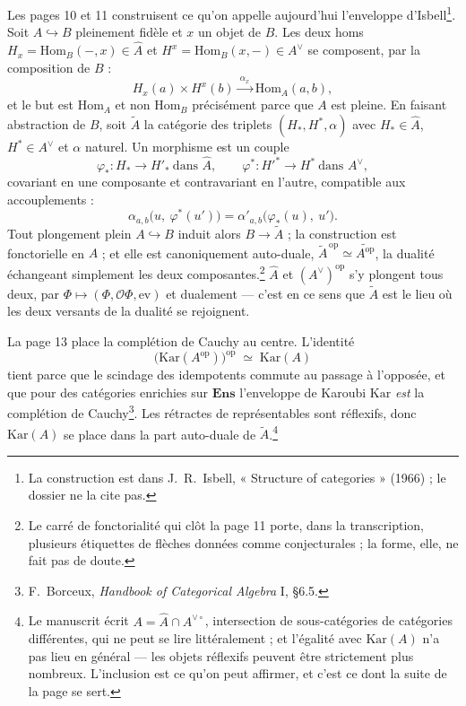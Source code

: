\documentclass[11pt,a4paper]{article}
\begin{document}
Les pages 10 et 11 construisent ce qu'on appelle aujourd'hui l'enveloppe
d'Isbell\footnote{La construction est dans J.~R.~Isbell, « Structure of
categories » (1966) ; le dossier ne la cite pas.}. Soit $A \hookrightarrow B$ pleinement fidèle et $x$ un objet de $B$.
Les deux homs $H_{x} = \mathrm{Hom}_{B}(-, x) \in \widehat{A}$ et $H^{x} =
\mathrm{Hom}_{B}(x, -) \in A^{\vee}$ se composent, par la composition de $B$ :
\[
H_{x}(a) \times H^{x}(b) \xrightarrow{\ \alpha_{x}\ } \mathrm{Hom}_{A}(a,b),
\]
et le but est $\mathrm{Hom}_{A}$ et non $\mathrm{Hom}_{B}$ précisément parce
que $A$ est pleine. En faisant abstraction de $B$, soit $\widetilde{A}$ la
catégorie des triplets $(H_{*}, H^{*}, \alpha)$ avec $H_{*} \in \widehat{A}$,
$H^{*} \in A^{\vee}$ et $\alpha$ naturel. Un morphisme est un couple
\[
\varphi_{*} : H_{*} \to H'_{*} \ \text{dans } \widehat{A},
\qquad
\varphi^{*} : H'^{*} \to H^{*} \ \text{dans } A^{\vee},
\]
covariant en une composante et contravariant en l'autre, compatible aux
accouplements :
\[
\alpha_{a,b}\bigl(u,\ \varphi^{*}(u')\bigr)
= \alpha'_{a,b}\bigl(\varphi_{*}(u),\ u'\bigr).
\]
Tout plongement plein $A \hookrightarrow B$ induit alors $B \to \widetilde{A}$ ;
la construction est fonctorielle en $A$ ; et elle est canoniquement auto-duale,
$\widetilde{A}^{\,\mathrm{op}} \simeq \widetilde{A^{\mathrm{op}}}$, la dualité
échangeant simplement les deux composantes.\footnote{Le carré de fonctorialité
qui clôt la page 11 porte, dans la transcription, plusieurs étiquettes de
flèches données comme conjecturales ; la forme, elle, ne fait pas de doute.}
$\widehat{A}$ et $(A^{\vee})^{\mathrm{op}}$ s'y plongent tous deux, par
$\Phi \mapsto (\Phi, \mathcal{O}\Phi, \mathrm{ev})$ et dualement — c'est en
ce sens que $\widetilde{A}$ est le lieu où les deux versants de la dualité se
rejoignent.

La page 13 place la complétion de Cauchy au centre. L'identité
\[
\bigl(\mathrm{Kar}(A^{\mathrm{op}})\bigr)^{\mathrm{op}} \;\simeq\; \mathrm{Kar}(A)
\]
tient parce que le scindage des idempotents commute au passage à l'opposée, et
que pour des catégories enrichies sur $\mathbf{Ens}$ l'enveloppe de Karoubi
$\mathrm{Kar}$ \emph{est} la complétion de Cauchy\footnote{F.~Borceux,
\emph{Handbook of Categorical Algebra} I, §6.5.}. Les rétractes de
représentables sont réflexifs, donc $\mathrm{Kar}(A)$ se place dans la part
auto-duale de $\widetilde{A}$.\footnote{Le manuscrit écrit $A = \widehat{A}
\cap A^{\vee\circ}$, intersection de sous-catégories de catégories
différentes, qui ne peut se lire littéralement ; et l'égalité avec
$\mathrm{Kar}(A)$ n'a pas lieu en général — les objets réflexifs peuvent être
strictement plus nombreux. L'inclusion est ce qu'on peut affirmer, et c'est ce
dont la suite de la page se sert.}
\end{document}
